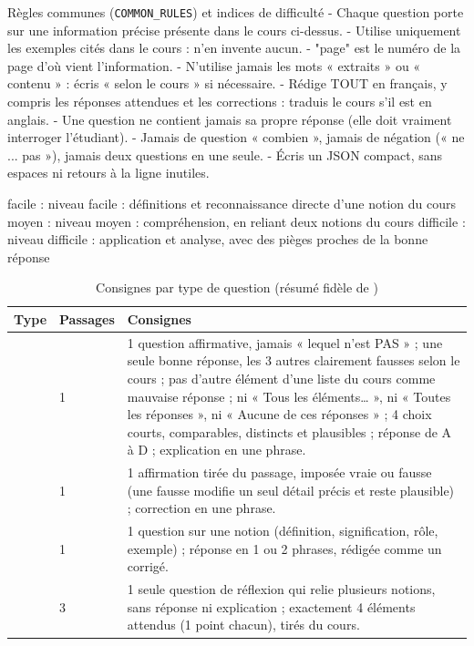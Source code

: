 \documentclass[12pt,a4paper]{report}
\DeclareRobustCommand{\code}[1]{\texttt{\codecasse{#1}}}
\begin{document}
\begin{prompt}{Règles communes (\texttt{COMMON\_RULES}) et indices de difficulté}
- Chaque question porte sur une information précise présente dans le cours ci-dessus.
- Utilise uniquement les exemples cités dans le cours : n'en invente aucun.
- "page" est le numéro de la page d'où vient l'information.
- N'utilise jamais les mots « extraits » ou « contenu » : écris « selon le cours » si nécessaire.
- Rédige TOUT en français, y compris les réponses attendues et les corrections : traduis le cours
  s'il est en anglais.
- Une question ne contient jamais sa propre réponse (elle doit vraiment interroger l'étudiant).
- Jamais de question « combien », jamais de négation (« ne ... pas »), jamais deux questions en
  une seule.
- Écris un JSON compact, sans espaces ni retours à la ligne inutiles.

facile    : niveau facile : définitions et reconnaissance directe d'une notion du cours
moyen     : niveau moyen : compréhension, en reliant deux notions du cours
difficile : niveau difficile : application et analyse, avec des pièges proches de la bonne réponse
\end{prompt}

\begin{table}[htbp]
\centering
\caption{Consignes par type de question (résumé fidèle de \code{TYPE_SPECS})}
\label{tab:type-specs}
\small
\begin{tabularx}{\textwidth}{@{}P{1.8cm}P{1.8cm}L@{}}
\toprule
\textbf{Type} & \textbf{Passages} & \textbf{Consignes} \\
\midrule
\code{qcm} & 1 & 1 question affirmative, jamais « lequel n'est PAS » ; une seule bonne réponse, les 3 autres clairement fausses selon le cours ; pas d'autre élément d'une liste du cours comme mauvaise réponse ; ni « Tous les éléments… », ni « Toutes les réponses », ni « Aucune de ces réponses » ; 4 choix courts, comparables, distincts et plausibles ; réponse de A à D ; explication en une phrase. \\
\code{vrai_faux} & 1 & 1 affirmation tirée du passage, imposée vraie ou fausse (une fausse modifie un seul détail précis et reste plausible) ; correction en une phrase. \\
\code{courte} & 1 & 1 question sur une notion (définition, signification, rôle, exemple) ; réponse en 1 ou 2 phrases, rédigée comme un corrigé. \\
\code{ouverte} & 3 & 1 seule question de réflexion qui relie plusieurs notions, sans réponse ni explication ; exactement 4 éléments attendus (1 point chacun), tirés du cours. \\
\bottomrule
\end{tabularx}
\end{table}
\end{document}

